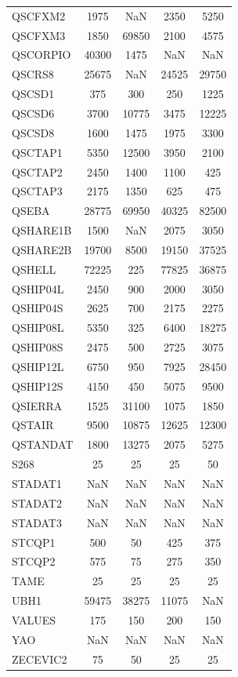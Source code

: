 \begin{longtable}{lcccc}
QSCFXM2  &     1975 &   NaN &     2350 &     5250 \\
QSCFXM3  &     1850 & 69850 &     2100 &     4575 \\
QSCORPIO &    40300 &  1475 &      NaN &      NaN \\
QSCRS8   &    25675 &   NaN &    24525 &    29750 \\
QSCSD1   &      375 &   300 &      250 &     1225 \\
QSCSD6   &     3700 & 10775 &     3475 &    12225 \\
QSCSD8   &     1600 &  1475 &     1975 &     3300 \\
QSCTAP1  &     5350 & 12500 &     3950 &     2100 \\
QSCTAP2  &     2450 &  1400 &     1100 &      425 \\
QSCTAP3  &     2175 &  1350 &      625 &      475 \\
QSEBA    &    28775 & 69950 &    40325 &    82500 \\
QSHARE1B &     1500 &   NaN &     2075 &     3050 \\
QSHARE2B &    19700 &  8500 &    19150 &    37525 \\
QSHELL   &    72225 &   225 &    77825 &    36875 \\
QSHIP04L &     2450 &   900 &     2000 &     3050 \\
QSHIP04S &     2625 &   700 &     2175 &     2275 \\
QSHIP08L &     5350 &   325 &     6400 &    18275 \\
QSHIP08S &     2475 &   500 &     2725 &     3075 \\
QSHIP12L &     6750 &   950 &     7925 &    28450 \\
QSHIP12S &     4150 &   450 &     5075 &     9500 \\
QSIERRA  &     1525 & 31100 &     1075 &     1850 \\
QSTAIR   &     9500 & 10875 &    12625 &    12300 \\
QSTANDAT &     1800 & 13275 &     2075 &     5275 \\
S268     &       25 &    25 &       25 &       50 \\
STADAT1  &      NaN &   NaN &      NaN &      NaN \\
STADAT2  &      NaN &   NaN &      NaN &      NaN \\
STADAT3  &      NaN &   NaN &      NaN &      NaN \\
STCQP1   &      500 &    50 &      425 &      375 \\
STCQP2   &      575 &    75 &      275 &      350 \\
TAME     &       25 &    25 &       25 &       25 \\
UBH1     &    59475 & 38275 &    11075 &      NaN \\
VALUES   &      175 &   150 &      200 &      150 \\
YAO      &      NaN &   NaN &      NaN &      NaN \\
ZECEVIC2 &       75 &    50 &       25 &       25 \\
\end{longtable}

